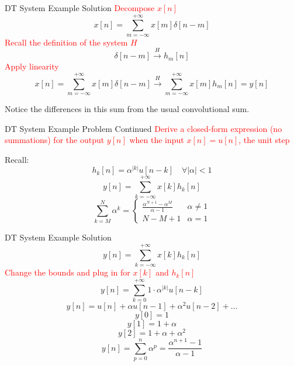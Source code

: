 \begin{frame}{DT System Example Solution}
    \textcolor{red}{Decompose $x[n]$}
    \[x[n] = \sum_{m=-\infty}^{+\infty}x[m]\delta[n-m]\]
    \textcolor{red}{Recall the definition of the system $H$}
    \[\delta[n-m] \overset{H}{\longrightarrow} h_m[n]\]
    \textcolor{red}{Apply linearity}
    \[x[n] = \sum_{m=-\infty}^{+\infty}x[m]\delta[n-m] \overset{H}{\longrightarrow} \sum_{m=-\infty}^{+\infty}x[m]h_m[n] = y[n]\]

    Notice the differences in this sum from the usual convolutional sum.
\end{frame}

\begin{frame}{DT System Example Problem Continued}
    \textcolor{red}{Derive a closed-form expression (no summations) for the output $y[n]$ when the input $x[n] = u[n]$, the unit step}

    Recall:
    \[h_k[n] = \alpha^{|k|}u[n-k] \quad \forall |\alpha| < 1\]
    \[y[n] = \sum_{k=-\infty}^{+\infty}x[k]h_k[n]\]
    \[\sum_{k=M}^N \alpha^k =
        \begin{cases}
            \frac{\alpha^{N+1}-\alpha^M}{\alpha-1} & \alpha\ne 1 \\
            N-M+1 & \alpha= 1
        \end{cases}
    \]
\end{frame}

\begin{frame}{DT System Example Solution}
    \[y[n] = \sum_{k=-\infty}^{+\infty}x[k]h_k[n]\]
    \textcolor{red}{Change the bounds and plug in for $x[k]$ and $h_k[n]$}
    \[y[n] = \sum_{k=0}^{+\infty}1\cdot \alpha^{|k|}u[n-k]\]
    \[y[n] = u[n] + \alpha u[n-1] + \alpha^2 u[n-2] + \dots\]
    \[y[0] = 1\]
    \[y[1] = 1+\alpha\]
    \[y[2] = 1+\alpha+\alpha^2\]
    \[y[n] = \sum_{p=0}^n \alpha^p = \frac{\alpha^{n+1}-1}{\alpha -1}\]

\end{frame}
